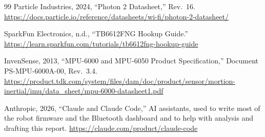 \begin{thebibliography}{99}
Particle Industries, 2024, ``Photon 2 Datasheet,'' Rev.~16.
\url{https://docs.particle.io/reference/datasheets/wi-fi/photon-2-datasheet/}

SparkFun Electronics, n.d., ``TB6612FNG Hookup Guide.''
\url{https://learn.sparkfun.com/tutorials/tb6612fng-hookup-guide}

InvenSense, 2013, ``MPU-6000 and MPU-6050 Product Specification,'' Document PS-MPU-6000A-00, Rev.~3.4.
\url{https://product.tdk.com/system/files/dam/doc/product/sensor/mortion-inertial/imu/data_sheet/mpu-6000-datasheet1.pdf}

Anthropic, 2026, ``Claude and Claude Code,'' AI assistants, used to write most of the robot firmware and the Bluetooth dashboard and to help with analysis and drafting this report.
\url{https://claude.com/product/claude-code}

\end{thebibliography}
